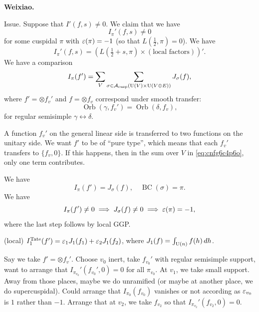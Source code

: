 \documentclass[reqno]{amsart} 
\begin{document}
\textbf{Weixiao.}

Issue.  Suppose that $I'(f, s) \neq 0$.  We claim that we have
\begin{equation*}
I_\pi '(f, s) \neq 0
\end{equation*}
for some cuspidal $\pi$ with $\varepsilon(\pi) = -1$ (so that $L(\tfrac{1}{2}, \pi) = 0$).  We have
\begin{equation*}
  I_\pi '(f, s) =
  \left( L(\tfrac{1}{2} + s, \pi )
  \times (\text{local factors}) \right)'.
\end{equation*}
We have a comparison
\begin{equation}\label{eq:cnfg6c4p6o}
  I_\pi(f') = \sum_{V} \sum_{\sigma \in \mathcal{A}_{\operatorname{cusp}}(\operatorname{U}(V) \times \operatorname{U}(V \oplus E))}
  J_\sigma(f),
\end{equation}
where $f ' = \otimes f_v '$ and $f = \otimes f_v$ correspond under smooth transfer:
\begin{equation*}
\operatorname{Orb}(\gamma, f_v ') = \operatorname{Orb}(\delta, f_v),
\end{equation*}
for regular semisimple $\gamma \leftrightarrow \delta$.

A function $f_v'$ on the general linear side is transferred to two functions on the unitary side.  We want $f'$  to be of ``pure type'', which means that each $f_v '$ transfers to $\{f_v, 0\}$.  If this happens, then in the sum over $V$ in \eqref{eq:cnfg6c4p6o}, only one term contributes.

We have
\begin{equation*}
I_\pi(f') = J_\sigma(f), \quad \operatorname{BC}(\sigma) = \pi.
\end{equation*}
We have
\begin{equation*}
I_\pi(f') \neq 0 \implies J_\sigma(f) \neq 0 \implies \varepsilon(\pi) = -1,
\end{equation*}
where the last step follows by local GGP.

\begin{proposition}[Wei for $n = 3$, Beuzart-Plessis]
  (local) $I_1^{\mathrm{Tate}}(f') = \varepsilon_1 J_1(f_1) + \varepsilon_2 J_1(f_2)$, where $J_1(f) = \int_{\operatorname{U}(n)} f(h) \, d h$.
\end{proposition}

Say we take $f ' = \otimes f_v '$.  Choose $v_0$ inert, take $f _{v_0}'$ with regular semisimple support, want to arrange that $I_{\pi_{v_0 }}'(f_{v_0 }', 0) = 0$ for all $\pi_{v_0}$.  At $v_1$, we take small support.  Away from those places, maybe we do unramified (or maybe at another place, we do supercuspidal).  Could arrange that $I_{\pi_0 }(f_{v_0 })$ vanishes or not according as $\varepsilon_{v_0}$ is $1$ rather than $-1$.  Arrange that at $v_2$, we take $f_{v_2}$ so that $I_{\pi_{v_2 }}'(f_{v_2}, 0) = 0$.
\end{document}
